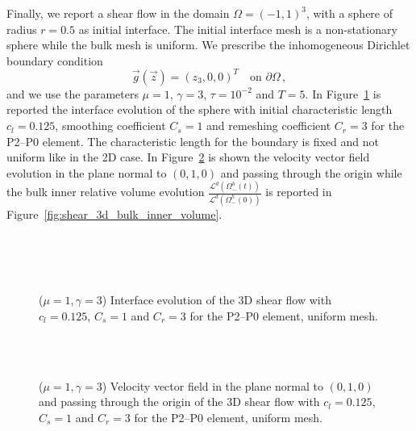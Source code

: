 \documentclass[a4paper,12pt,onecolumn]{article}
\begin{document}
Finally, we report a shear flow in the domain $\Omega=(-1,1)^3$, with a sphere
of radius $r=0.5$ as initial interface. The initial interface mesh is a
non-stationary sphere while the bulk mesh is uniform. We prescribe the
inhomogeneous Dirichlet boundary condition
\begin{equation*}
\vec g(\vec z)=(z_3,0,0)^T\quad \mbox{on }\partial\Omega\,,
\end{equation*}
and we use the parameters $\mu=1$, $\gamma=3$, $\tau=10^{-2}$ and $T=5$. In
Figure~\ref{fig:shear_3d} is reported the interface evolution of the sphere with
initial characteristic length $c_l=0.125$, smoothing coefficient $C_s=1$ and
remeshing coefficient $C_r=3$ for the P2--P0 element. The characteristic length
for the boundary is fixed and not uniform like in the 2D case. In
Figure~\ref{fig:shear_3d_velocity} is shown the velocity vector field evolution
in the plane normal to $(0,1,0)$ and passing through the origin while the bulk
inner relative volume evolution
$\frac{\mathcal{L}^d(\Omega^h_-(t))}{\mathcal{L}^d(\Omega^h_-(0))}$ is reported
in Figure~\ref{fig:shear_3d_bulk_inner_volume}.
\begin{figure}[htbp]
  \centering
  \\
  \quad
  \\
  \quad
  \\
  \caption{($\mu=1,\gamma=3$) Interface evolution of the 3D shear flow with
$c_l=0.125$, $C_s=1$ and $C_r=3$ for the P2--P0 element, uniform mesh.}
  \label{fig:shear_3d}
\end{figure}

\begin{figure}[htbp]
  \centering
  \quad
  \\
  \quad
  \\
  \caption{($\mu=1,\gamma=3$) Velocity vector field in the plane normal to
$(0,1,0)$ and passing through the origin of the 3D shear flow with $c_l=0.125$,
$C_s=1$ and $C_r=3$ for the P2--P0 element, uniform mesh.}
  \label{fig:shear_3d_velocity}
\end{figure}
\end{document}
